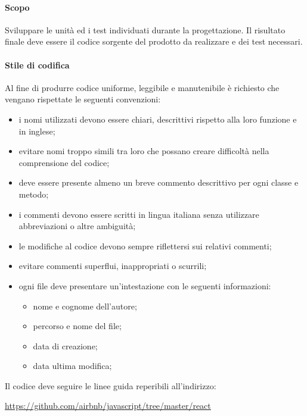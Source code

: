                 \paragraph{Scopo}
                Sviluppare le unità ed i test individuati durante la progettazione. Il risultato finale deve essere il codice sorgente del prodotto da realizzare e dei test necessari.
                
                \paragraph{Stile di codifica} \label{codeStyle}
                Al fine di produrre codice uniforme, leggibile e manutenibile è richiesto che vengano rispettate le seguenti convenzioni:
                \begin{itemize}
                    \item i nomi utilizzati devono essere chiari, descrittivi rispetto alla loro funzione e in inglese;
                    \item evitare nomi troppo simili tra loro che possano creare difficoltà nella comprensione del codice;
                    \item deve essere presente almeno un breve commento descrittivo per ogni classe e metodo;
                    \item i commenti devono essere scritti in lingua italiana senza utilizzare abbreviazioni o altre ambiguità;
                    \item le modifiche al codice devono sempre riflettersi sui relativi commenti;
                    \item evitare commenti superflui, inappropriati o scurrili;
                    \item ogni file deve presentare un'intestazione con le seguenti informazioni:
                        \begin{itemize}
                        	\item nome e cognome dell'autore;
                            \item percorso e nome del file;
                            \item data di creazione;
							\item data ultima modifica;
                        \end{itemize}
                \end{itemize}
	            Il codice deve seguire le linee guida reperibili all'indirizzo:
	            \begin{center} \label{sec:stileCodifica}
	            	\url{https://github.com/airbnb/javascript/tree/master/react}
	            \end{center}

